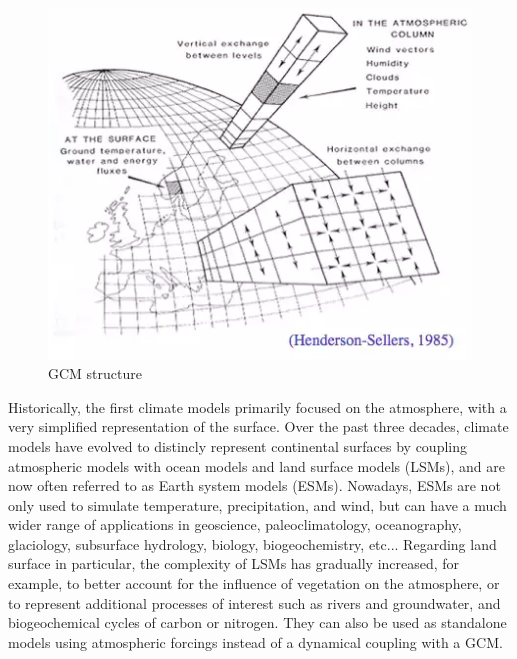 \begin{figure}[ht]
    \centering
    \includegraphics[width=\textwidth]{images/intro/GCM_structure.png}
    \caption{GCM structure %
    }
    \label{fig:GCM}
\end{figure}


Historically, the first climate models primarily focused on the atmosphere, with
a very simplified representation of the surface. Over the past three decades, climate models have evolved to distincly represent continental surfaces by coupling atmospheric models with ocean models and land surface models (LSMs), and are now often referred to as Earth system models (ESMs). Nowadays, ESMs are not only used to simulate temperature, precipitation, and wind, but can have a much wider range of applications in geoscience, paleoclimatology, oceanography, glaciology, subsurface hydrology, biology, biogeochemistry, etc... 
Regarding land surface in particular, the complexity of LSMs has gradually increased, for example, to better account for the influence of vegetation on the atmosphere, or to represent additional processes of interest such as rivers and groundwater, and biogeochemical cycles of carbon or nitrogen. They can also be used as standalone models using atmospheric forcings instead of a dynamical coupling with a GCM.



